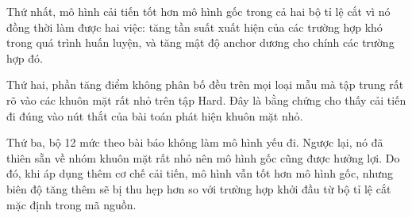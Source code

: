 Thứ nhất, mô hình cải tiến tốt hơn mô hình gốc trong cả hai bộ tỉ lệ cắt vì nó đồng thời làm được hai việc: tăng tần suất xuất hiện của các trường hợp khó trong quá trình huấn luyện, và tăng mật độ anchor dương cho chính các trường hợp đó.

Thứ hai, phần tăng điểm không phân bố đều trên mọi loại mẫu mà tập trung rất rõ vào các khuôn mặt rất nhỏ trên tập Hard.
Đây là bằng chứng cho thấy cải tiến đi đúng vào nút thắt của bài toán phát hiện khuôn mặt nhỏ.

Thứ ba, bộ 12 mức theo bài báo không làm mô hình yếu đi.
Ngược lại, nó đã thiên sẵn về nhóm khuôn mặt rất nhỏ nên mô hình gốc cũng được hưởng lợi.
Do đó, khi áp dụng thêm cơ chế cải tiến, mô hình vẫn tốt hơn mô hình gốc, nhưng biên độ tăng thêm sẽ bị thu hẹp hơn so với trường hợp khởi đầu từ bộ tỉ lệ cắt mặc định trong mã nguồn.
